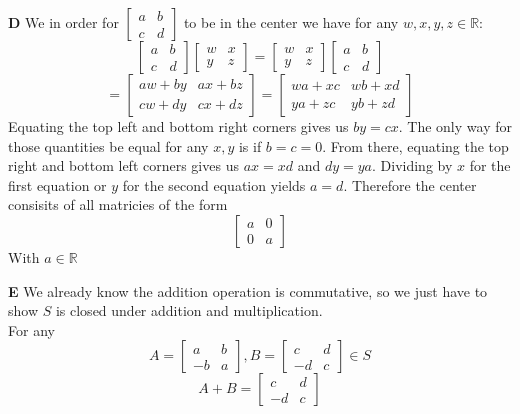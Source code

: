 \documentclass[12pt]{article}
\newenvironment{ques}{\vspace{2 ex}}{\vspace{2 ex}}
\theoremstyle{definition}
\begin{document}
\begin{ques}
	\textbf{D}
	We in order for $\left[\begin{array}{cc} a & b \\ c & d
	\end{array}\right]$ to be in the center we have for any $w,x,y,z
	\in \mathbb R$:
	$$\left[\begin{array}{cc} a & b \\ c &
	d \end{array}\right]\left[\begin{array}{cc} w &
	x \\ y & z \end{array}\right] =
	\left[\begin{array}{cc} w & x \\ y & z
	\end{array}\right]\left[\begin{array}{cc}
	a & b \\ c & d \end{array}\right]$$
	$$= \left[\begin{array}{cc} aw + by & ax + bz
	\\ cw + dy & cx + dz \end{array}\right] =
	\left[\begin{array}{cc} wa + xc & wb + xd
	\\ ya + zc & yb + zd \end{array}\right] $$
	Equating the top left and bottom right corners gives us $by =
	cx$. The only way for those quantities be equal for any $x,y$ is if
	$b= c= 0$. From there, equating the top right and bottom left
	corners gives us $ax = xd$ and $dy = ya$. Dividing by $x$ for
	the first equation or $y$ for the second equation yields $a =
	d$. Therefore the center consisits of all matricies of the form
	$$\left[ \begin{array}{cc} a & 0 \\ 0 & a \end{array} \right]$$
	With $a \in \mathbb R$
\end{ques}

\begin{ques}
	\textbf{E}
	We already know the addition operation is commutative, so we just have
	to show $S$ is closed under addition and multiplication.\\
	For any 
	$$A = \left[\begin{array}{cc} a & b \\ -b & a \end{array}\right], B =
	\left[\begin{array}{cc} c & d\\ -d & c \end{array}\right] \in S$$
	$$A + B = \left[\begin{array}{cc} c & d\\ -d & c \end{array}\right]$$
\end{ques}
\end{document}
